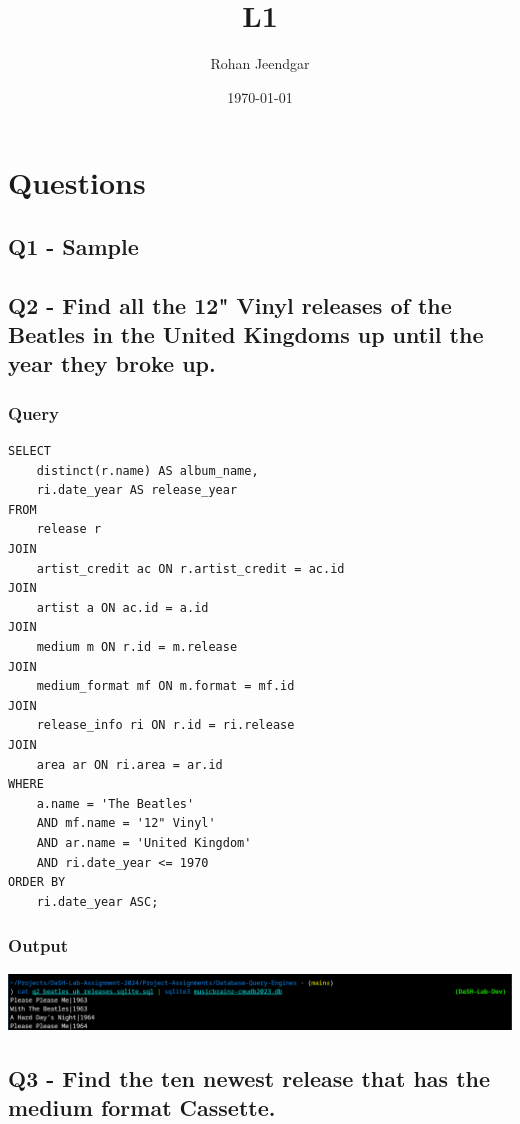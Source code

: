 \documentclass[11pt]{article}
\author{Rohan Jeendgar}
\date{\today}
\title{L1}
\begin{document}
\maketitle
\tableofcontents

\section{Questions}
\label{sec:org73bb228}
\subsection{Q1 - Sample}
\label{sec:orgb26f742}
\subsection{Q2 - Find all the 12" Vinyl releases of the Beatles in the United Kingdoms up until the year they broke up.}
\label{sec:orgc401736}
\subsubsection{Query}
\label{sec:orgabeb225}
\begin{verbatim}
SELECT
    distinct(r.name) AS album_name,
    ri.date_year AS release_year
FROM
    release r
JOIN
    artist_credit ac ON r.artist_credit = ac.id
JOIN
    artist a ON ac.id = a.id
JOIN
    medium m ON r.id = m.release
JOIN
    medium_format mf ON m.format = mf.id
JOIN
    release_info ri ON r.id = ri.release
JOIN
    area ar ON ri.area = ar.id
WHERE
    a.name = 'The Beatles'
    AND mf.name = '12" Vinyl'
    AND ar.name = 'United Kingdom'
    AND ri.date_year <= 1970
ORDER BY
    ri.date_year ASC;

\end{verbatim}
\subsubsection{Output}
\label{sec:orgeb330e0}
\begin{center}
\includegraphics[width=.9\linewidth]{./images/Q2.png}
\end{center}
\subsection{Q3 - Find the ten newest release that has the medium format Cassette.}
\label{sec:orgc443dda}
\end{document}
